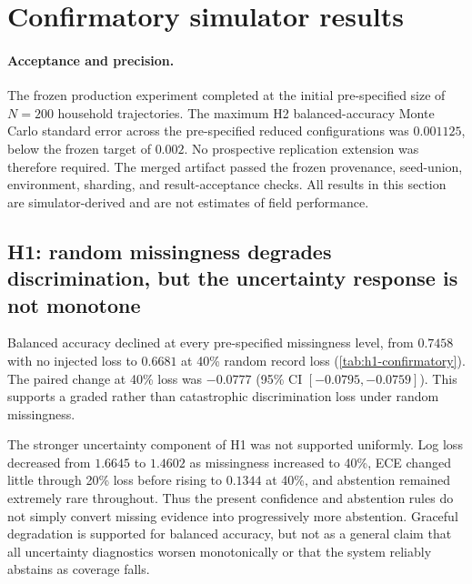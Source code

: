 
\section{Confirmatory simulator results}
\label{sec:confirmatory-results}

\paragraph{Acceptance and precision.}
The frozen production experiment completed at the initial pre-specified size of $N=200$ household trajectories. The maximum H2 balanced-accuracy Monte Carlo standard error across the pre-specified reduced configurations was $0.001125$, below the frozen target of $0.002$. No prospective replication extension was therefore required. The merged artifact passed the frozen provenance, seed-union, environment, sharding, and result-acceptance checks. All results in this section are simulator-derived and are not estimates of field performance.

\subsection{H1: random missingness degrades discrimination, but the uncertainty response is not monotone}

Balanced accuracy declined at every pre-specified missingness level, from $0.7458$ with no injected loss to $0.6681$ at 40\% random record loss (\cref{tab:h1-confirmatory}). The paired change at 40\% loss was $-0.0777$ (95\% CI $[-0.0795,-0.0759]$). This supports a graded rather than catastrophic discrimination loss under random missingness.

The stronger uncertainty component of H1 was not supported uniformly. Log loss decreased from $1.6645$ to $1.4602$ as missingness increased to 40\%, ECE changed little through 20\% loss before rising to $0.1344$ at 40\%, and abstention remained extremely rare throughout. Thus the present confidence and abstention rules do not simply convert missing evidence into progressively more abstention. Graceful degradation is supported for balanced accuracy, but not as a general claim that all uncertainty diagnostics worsen monotonically or that the system reliably abstains as coverage falls.

